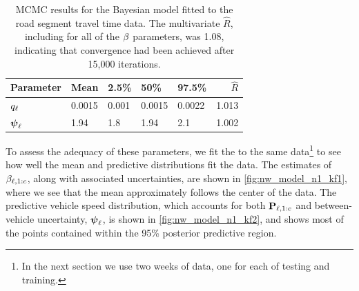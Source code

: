 \begin{table}

\caption[MCMC results for the Bayesian model fitted to the road segment travel time data]{\label{tab:nw_model_fit_smry}MCMC results for the Bayesian model fitted to the road segment travel time data. The multivariate $\hat R$, including for all of the $\beta$ parameters, was 1.08, indicating that convergence had been achieved after 15,000 iterations.}
\centering
\begin{tabular}[b]{lllllr}
\toprule
Parameter & Mean & 2.5\% & 50\% & 97.5\% & $\hat R$\\
\midrule
$q_\ell$ & 0.0015 & 0.001 & 0.0015 & 0.0022 & 1.013\\
$\mathbf{\boldsymbol{\psi}}_\ell$ & 1.94 & 1.8 & 1.94 & 2.1 & 1.002\\
\bottomrule
\end{tabular}
\end{table}



To assess the adequacy of these parameters, we fit the \kf{} to the same data\footnote{In the next section we use two weeks of data, one for each of testing and training.} to see how well the mean and predictive distributions fit the data. The estimates of $\beta_{\ell,1:c}$, along with associated uncertainties, are shown in \cref{fig:nw_model_n1_kf1}, where we see that the mean approximately follows the center of the data. The predictive vehicle speed distribution, which accounts for both $\mathbf{P}_{\ell,1:c}$ and between-vehicle uncertainty, $\mathbf{\boldsymbol{\psi}}_{\ell}$, is shown in \cref{fig:nw_model_n1_kf2}, and shows most of the points contained within the 95\% posterior predictive region.


